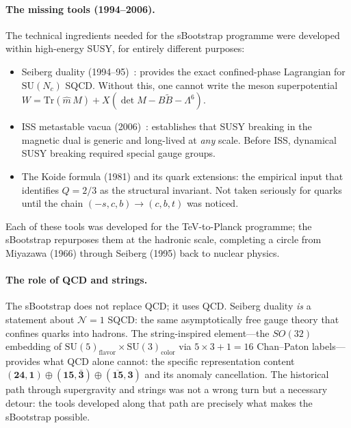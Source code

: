 \documentclass[12pt,a4paper]{article}
\begin{document}
\paragraph{The missing tools (1994--2006).}
The technical ingredients needed for the sBootstrap programme were
developed within high-energy SUSY, for entirely different purposes:
\begin{itemize}
\item Seiberg duality (1994--95)~\cite{Seiberg1995}: provides the
  exact confined-phase Lagrangian for $\mathrm{SU}(N_c)$ SQCD.
  Without this, one cannot write the meson superpotential
  $W = \text{Tr}(\hat{m}\,M) + X(\det M - B\tilde{B} - \Lambda^6)$.
\item ISS metastable vacua (2006)~\cite{ISS2006}: establishes that
  SUSY breaking in the magnetic dual is generic and
  long-lived at \emph{any} scale.  Before ISS, dynamical SUSY
  breaking required special gauge groups.
\item The Koide formula (1981) and its quark extensions:
  the empirical input that identifies $Q = 2/3$ as the structural
  invariant.  Not taken seriously for quarks until the chain
  $(-s,c,b) \to (c,b,t)$ was noticed.
\end{itemize}
Each of these tools was developed for the
TeV-to-Planck programme; the sBootstrap repurposes them at the
hadronic scale, completing a circle from Miyazawa (1966) through
Seiberg (1995) back to nuclear physics.

\paragraph{The role of QCD and strings.}
The sBootstrap does not replace QCD; it uses QCD.  Seiberg duality
\emph{is} a statement about $\mathcal{N}=1$ SQCD: the same
asymptotically free gauge theory that confines quarks into hadrons.
The string-inspired element---the $SO(32)$ embedding of
$\mathrm{SU}(5)_{\text{flavor}} \times \mathrm{SU}(3)_{\text{color}}$
via $5 \times 3 + 1 = 16$ Chan--Paton labels---provides what QCD
alone cannot: the specific representation content
$(\mathbf{24},\mathbf{1}) \oplus (\mathbf{15},\bar{\mathbf{3}})
\oplus (\overline{\mathbf{15}},\mathbf{3})$ and its anomaly
cancellation.  The historical path through supergravity and strings
was not a wrong turn but a necessary detour: the tools developed
along that path are precisely what makes the sBootstrap possible.
\end{document}
